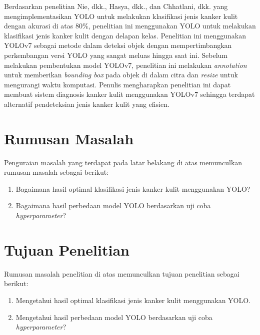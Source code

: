     Berdasarkan penelitian Nie, dkk., Hasya, dkk., dan Chhatlani, dkk. yang mengimplementasikan YOLO untuk melakukan klasifikasi jenis kanker kulit dengan akurasi di atas $80\%$, penelitian ini menggunakan YOLO untuk melakukan klasifikasi jenis kanker kulit dengan delapan kelas. Penelitian ini menggunakan YOLOv7 sebagai metode dalam deteksi objek dengan mempertimbangkan perkembangan versi YOLO yang sangat meluas hingga saat ini. Sebelum melakukan pembentukan model YOLOv7, penelitian ini melakukan \textit{annotation} untuk memberikan \textit{bounding box} pada objek di dalam citra dan \textit{resize} untuk mengurangi waktu komputasi. Penulis mengharapkan penelitian ini dapat membuat sistem diagnosis kanker kulit menggunakan YOLOv7 sehingga terdapat alternatif pendeteksian jenis kanker kulit yang efisien.

    \section{Rumusan Masalah}
    Penguraian masalah yang terdapat pada latar belakang di atas memunculkan rumusan masalah sebagai berikut:
    \begin{enumerate}
        \item Bagaimana hasil optimal klasifikasi jenis kanker kulit menggunakan YOLO?
        \item Bagaimana hasil perbedaan model YOLO berdasarkan uji coba \textit{hyperparameter}?
    \end{enumerate}

    \section{Tujuan Penelitian}
    Rumusan masalah penelitian di atas memunculkan tujuan penelitian sebagai berikut:
    \begin{enumerate}
        \item Mengetahui hasil optimal klasifikasi jenis kanker kulit menggunakan YOLO.
        \item Mengetahui hasil perbedaan model YOLO berdasarkan uji coba \textit{hyperparameter}?
    \end{enumerate}

